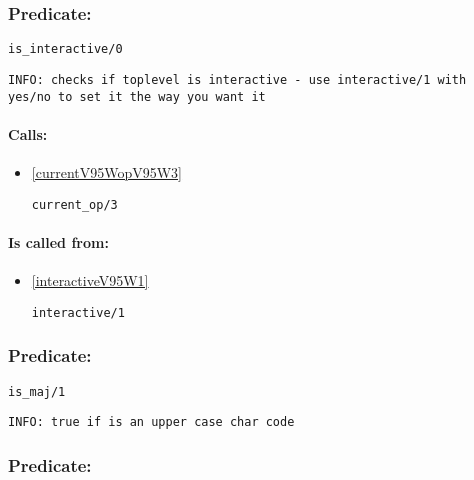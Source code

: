 \subsubsection{Predicate:} \label{isV95WinteractiveV95W0}

\begin{verbatim}
is_interactive/0
\end{verbatim}

{\small \begin{verbatim}
INFO: checks if toplevel is interactive - use interactive/1 with yes/no to set it the way you want it

\end{verbatim}}
\paragraph{Calls:} 
\begin{itemize}
\item \ref{currentV95WopV95W3} 
\begin{verbatim}
current_op/3
\end{verbatim}

\end{itemize}
\paragraph{Is called from:} 
\begin{itemize}
\item \ref{interactiveV95W1} 
\begin{verbatim}
interactive/1
\end{verbatim}

\end{itemize}

\subsubsection{Predicate:} \label{isV95WmajV95W1}

\begin{verbatim}
is_maj/1
\end{verbatim}

{\small \begin{verbatim}
INFO: true if is an upper case char code

\end{verbatim}}

\subsubsection{Predicate:} \label{isV95WminV95W1}

